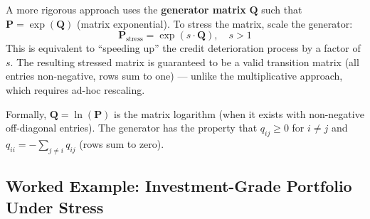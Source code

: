 \documentclass[11pt, a4paper]{article}
\theoremstyle{definition}
\theoremstyle{plain}
\theoremstyle{remark}
\begin{document}
\begin{keyidea}
A more rigorous approach uses the \textbf{generator matrix} $\bm{Q}$ such that
$\bm{P} = \exp(\bm{Q})$ (matrix exponential).
To stress the matrix, scale the generator:
\[
    \bm{P}_{\text{stress}} = \exp(s \cdot \bm{Q}), \quad s > 1
\]
This is equivalent to ``speeding up'' the credit deterioration process
by a factor of $s$.
The resulting stressed matrix is guaranteed to be a valid transition matrix
(all entries non-negative, rows sum to one) --- unlike the multiplicative approach,
which requires ad-hoc rescaling.

\medskip

Formally, $\bm{Q} = \ln(\bm{P})$ is the matrix logarithm (when it exists with non-negative off-diagonal entries).
The generator has the property that $q_{ij} \geq 0$ for $i \neq j$
and $q_{ii} = -\sum_{j \neq i} q_{ij}$ (rows sum to zero).
\end{keyidea}

\subsection{Worked Example: Investment-Grade Portfolio Under Stress}
\end{document}
